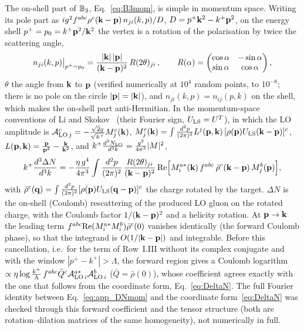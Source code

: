 The on-shell part of $\mathbb{B}_3$, Eq.~\eqref{eq:B3mom}, is simple in momentum space. Writing its pole part as $ig^2f^{abc}\rho^c(\mathbf{k}-\mathbf{p})\,n_{ji}(k,p)/D$, $D=p^+\mathbf{k}^2-k^+\mathbf{p}^2$, on the energy shell $p^+=p_0=k^+\mathbf{p}^2/\mathbf{k}^2$ the vertex is a rotation of the polarisation by twice the scattering angle,
\begin{align}\label{eq:app_nshell}
n_{ji}(k,p)\big|_{p^+=p_0}=\frac{|\mathbf{k}|\,|\mathbf{p}|}{(\mathbf{k}-\mathbf{p})^2}\,R(2\theta)_{ji}\,,\qquad R(\alpha)=\begin{pmatrix}\cos\alpha&-\sin\alpha\\ \sin\alpha&\cos\alpha\end{pmatrix},
\end{align}
$\theta$ the angle from $\mathbf{k}$ to $\mathbf{p}$ (verified numerically at $10^4$ random points, to $10^{-8}$; there is no pole on the circle $|\mathbf{p}|=|\mathbf{k}|$), and $n_{ji}(k,p)=n_{ij}(p,k)$ on the shell, which makes the on-shell part anti-Hermitian. In the momentum-space conventions of Li and Skokov~\cite{Li:2021ntm} (their Fourier sign, $U_{\rm LS}=U^T$), in which the LO amplitude is $\mathcal A^c_{{\rm LO}\,j}=-\frac{\sqrt2g}{\sqrt{k^+}}M^c_j(\mathbf{k})$, $M^c_j(\mathbf{k})=\int\frac{d^2p}{(2\pi)^2}L^j(\mathbf{p},\mathbf{k})\,[\rho(\mathbf{p})U_{\rm LS}(\mathbf{k}-\mathbf{p})]^c$, $L(\mathbf{p},\mathbf{k})=\frac{\mathbf{p}}{\mathbf{p}^2}-\frac{\mathbf{k}}{\mathbf{k}^2}$, and $k^+\frac{d^3N_{\rm LO}}{d^3k}=\frac{g^2}{4\pi^3}|M|^2$,
\begin{align}\label{eq:app_DNmom}
k^+\frac{d^3\Delta N}{d^3k}=-\frac{\eta\,g^4}{4\pi^3}\int\frac{d^2p}{(2\pi)^2}\,\frac{R(2\theta)_{ji}}{(\mathbf{k}-\mathbf{p})^2}\,{\rm Re}\Big[M^{a*}_i(\mathbf{k})\,f^{abc}\,\bar\rho^c(\mathbf{k}-\mathbf{p})\,M^b_j(\mathbf{p})\Big],
\end{align}
with $\bar\rho^c(\mathbf{q})=\int\frac{d^2p}{(2\pi)^2}[\rho(\mathbf{p})U_{\rm LS}(\mathbf{q}-\mathbf{p})]^c$ the charge rotated by the target. $\Delta N$ is the on-shell (Coulomb) rescattering of the produced LO gluon on the rotated charge, with the Coulomb factor $1/(\mathbf{k}-\mathbf{p})^2$ and a helicity rotation. At $\mathbf{p}\to\mathbf{k}$ the leading term $f^{abc}{\rm Re}(M^{a*}_iM^b_i)\bar\rho^c(0)$ vanishes identically (the forward Coulomb phase), so that the integrand is $O(1/|\mathbf{k}-\mathbf{p}|)$ and integrable. Before this cancellation, i.e.\ for the term of Row~I.III without its complex conjugate and with the window $|p^+-k^+|>\Lambda$, the forward region gives a Coulomb logarithm $\propto\eta\log\frac{k^+}{\Lambda}\,f^{abc}\bar Q^c\mathcal A^{a*}_{{\rm LO}\,i}\mathcal A^b_{{\rm LO}\,i}$ ($\bar Q=\bar\rho(0)$), whose coefficient agrees exactly with the one that follows from the coordinate form, Eq.~\eqref{eq:DeltaN}. The full Fourier identity between Eq.~\eqref{eq:app_DNmom} and the coordinate form~\eqref{eq:DeltaN} was checked through this forward coefficient and the tensor structure (both are rotation--dilation matrices of the same homogeneity), not numerically in full.

